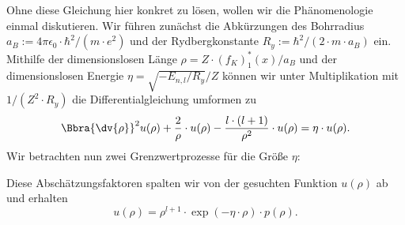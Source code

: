 \documentclass{article}
\begin{document}
    Ohne diese Gleichung hier konkret zu lösen, wollen wir die Phänomenologie einmal diskutieren. Wir führen zunächst die Abkürzungen des Bohrradius $a_B := 4\pi\epsilon_0\cdot\hbar^2/(m\cdot e^2)$ und der Rydbergkonstante $R_y := \hbar^2/(2\cdot m\cdot a_B)$ ein. Mithilfe der dimensionslosen Länge $\rho = Z\cdot (f_K)_1^*(x)/a_B$ und der dimensionslosen Energie $\eta = \sqrt{-E_{n,l}/R_y}/ Z$ können wir unter Multiplikation mit $1 / (Z^2\cdot R_y)$ die Differentialgleichung umformen zu
    \[
        \Bbra{\dv{\rho}}^2 u(\rho) + \frac{2}{\rho}\cdot u(\rho) - \frac{l\cdot(l+1)}{\rho^2}\cdot u(\rho) = \eta\cdot u(\rho).
    \]
    Wir betrachten nun zwei Grenzwertprozesse für die Größe $\eta$:
    Diese Abschätzungsfaktoren spalten wir von der gesuchten Funktion $u(\rho)$ ab und erhalten 
    \[
        u(\rho) = \rho^{l+1}\cdot\exp(-\eta\cdot\rho)\cdot p(\rho).
    \] 
\end{document}
